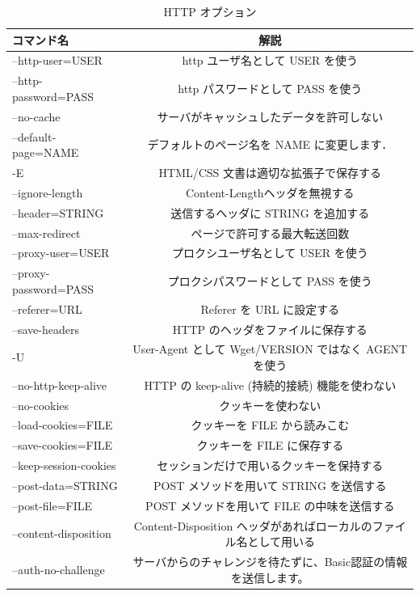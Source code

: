 \begin{table}[H]
  \begin{center}
    \caption{HTTP オプション}
    \begin{tabular}{|l|c|} \hline
      コマンド名 & 解説  \\ \hline
 --http-user=USER & http ユーザ名として USER を使う \\
       --http-password=PASS & http パスワードとして PASS を使う \\
       --no-cache & サーバがキャッシュしたデータを許可しない \\
       --default-page=NAME & デフォルトのページ名を NAME に変更します． \\
  -E & HTML/CSS 文書は適切な拡張子で保存する \\
       --ignore-length & Content-Lengthヘッダを無視する \\
       --header=STRING & 送信するヘッダに STRING を追加する \\
       --max-redirect & ページで許可する最大転送回数 \\
       --proxy-user=USER & プロクシユーザ名として USER を使う \\
       --proxy-password=PASS & プロクシパスワードとして PASS を使う \\
       --referer=URL & Referer を URL に設定する \\
       --save-headers & HTTP のヘッダをファイルに保存する \\
  -U & User-Agent として Wget/VERSION ではなく AGENT を使う \\
       --no-http-keep-alive & HTTP の keep-alive (持続的接続) 機能を使わない \\
       --no-cookies & クッキーを使わない \\
       --load-cookies=FILE & クッキーを FILE から読みこむ \\
       --save-cookies=FILE & クッキーを FILE に保存する \\
       --keep-session-cookies & セッションだけで用いるクッキーを保持する \\
       --post-data=STRING & POST メソッドを用いて STRING を送信する \\
       --post-file=FILE & POST メソッドを用いて FILE の中味を送信する \\
       --content-disposition & Content-Disposition ヘッダがあればローカルのファイル名として用いる \\ 
       --auth-no-challenge & サーバからのチャレンジを待たずに、Basic認証の情報を送信します。 \\ \hline
    \end{tabular}
  \end{center}
\end{table}

